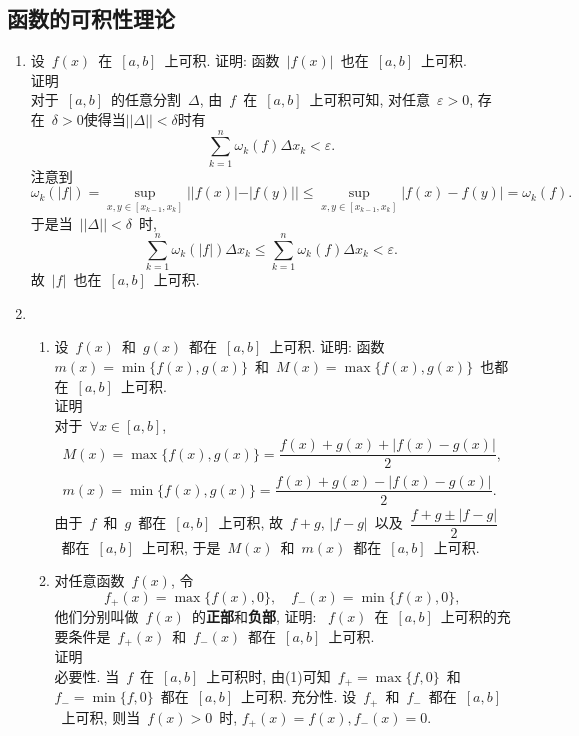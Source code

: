 \documentclass[UTF8,a4paper,20pt]{article}
\begin{document}
\subsection{函数的可积性理论}
\begin{enumerate}
\item 设~$f(x)$~在~$[a,b]$~上可积. 证明: 函数~$|f(x)|$~也在~$[a,b]$~上可积.\\
{\heiti 证明}\\
	对于~$[a,b]$~的任意分割~$\Delta$, 由~$f$~在~$[a,b]$~上可积可知, 对任意~$\varepsilon>0$, 存在~$\delta>0$使得当$||\Delta||<\delta$时有
\[ \sum_{k=1}^n \omega_k(f)\Delta x_k<\varepsilon.\]
注意到
\[ \omega_k(|f|)=\sup_{x,y\in[x_{k-1},x_k]}||f(x)|-|f(y)||\leqslant\sup_{x,y\in[x_{k-1},x_k]}|f(x)-f(y)|=\omega_k(f).\]
于是当~$||\Delta||<\delta$~时,
\[\sum_{k=1}^n \omega_k(|f|)\Delta x_k\leqslant \sum_{k=1}^n \omega_k(f)\Delta x_k<\varepsilon.\]
故~$|f|$~也在~$[a,b]$~上可积.

\item 
	\begin{enumerate}[(1)]
	\item 设~$f(x)$~和~$g(x)$~都在~$[a,b]$~上可积. 证明: 函数~$m(x)=\min\{f(x),g(x)\}$~和~$M(x)=\max\{f(x),g(x)\}$~也都在~$[a,b]$~上可积.\\
	{\heiti 证明}\\
	对于~$\forall x\in [a,b]$, 
	\begin{equation*}
		\begin{split} 
			M(x)=\max\{f(x),g(x)\}=\dfrac{f(x)+g(x)+|f(x)-g(x)|}{2},\\
			m(x)=\min\{f(x), g(x)\}=\dfrac{f(x)+g(x)-|f(x)-g(x)|}{2}.
		\end{split}
	\end{equation*}
	由于~$f$~和~$g$~都在~$[a,b]$~上可积, 故~$f+g$, $|f-g|$~以及~$\dfrac{f+g\pm|f-g|}{2}$~都在~$[a,b]$~上可积, 于是~$M(x)$~和~$m(x)$~都在~$[a,b]$~上可积.

	\item 对任意函数~$f(x)$, 令
		\[f_{+}(x)=\max\{f(x), 0\}, \quad f_{-}(x)=\min\{f(x),0\},\]
	他们分别叫做~$f(x)$~的{\bf 正部}和{\bf 负部}, 证明: ~$f(x)$~在~$[a,b]$~上可积的充要条件是~$f_{+}(x)$~和~$f_{-}(x)$~都在~$[a,b]$~上可积.\\
	{\heiti 证明}\\
	必要性. 当~$f$~在~$[a,b]$~上可积时, 由(1)可知~$f_{+}=\max\{f,0\}$~和~$f_{-}=\min\{f,0\}$~都在~$[a,b]$~上可积. 充分性. 设~$f_{+}$~和~$f_{-}$~都在~$[a,b]$~上可积, 则当~$f(x)>0$~时, $f_{+}(x)=f(x), f_{-}(x)=0$. 


\end{enumerate}
\end{enumerate}
\end{document}
